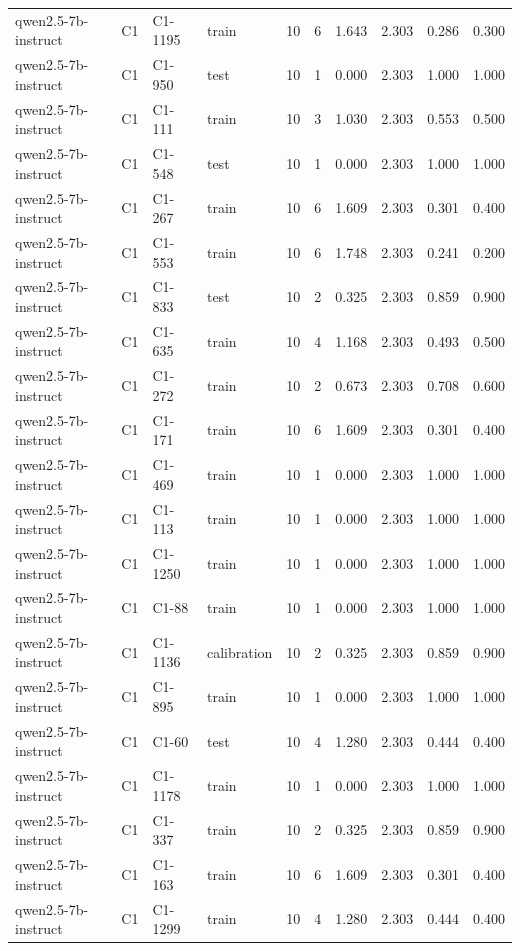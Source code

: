 \begin{table}
\begin{tabular}{llllrrrrrr}
qwen2.5-7b-instruct & C1 & C1-1195 & train & 10 & 6 & 1.643 & 2.303 & 0.286 & 0.300 \\
qwen2.5-7b-instruct & C1 & C1-950 & test & 10 & 1 & 0.000 & 2.303 & 1.000 & 1.000 \\
qwen2.5-7b-instruct & C1 & C1-111 & train & 10 & 3 & 1.030 & 2.303 & 0.553 & 0.500 \\
qwen2.5-7b-instruct & C1 & C1-548 & test & 10 & 1 & 0.000 & 2.303 & 1.000 & 1.000 \\
qwen2.5-7b-instruct & C1 & C1-267 & train & 10 & 6 & 1.609 & 2.303 & 0.301 & 0.400 \\
qwen2.5-7b-instruct & C1 & C1-553 & train & 10 & 6 & 1.748 & 2.303 & 0.241 & 0.200 \\
qwen2.5-7b-instruct & C1 & C1-833 & test & 10 & 2 & 0.325 & 2.303 & 0.859 & 0.900 \\
qwen2.5-7b-instruct & C1 & C1-635 & train & 10 & 4 & 1.168 & 2.303 & 0.493 & 0.500 \\
qwen2.5-7b-instruct & C1 & C1-272 & train & 10 & 2 & 0.673 & 2.303 & 0.708 & 0.600 \\
qwen2.5-7b-instruct & C1 & C1-171 & train & 10 & 6 & 1.609 & 2.303 & 0.301 & 0.400 \\
qwen2.5-7b-instruct & C1 & C1-469 & train & 10 & 1 & 0.000 & 2.303 & 1.000 & 1.000 \\
qwen2.5-7b-instruct & C1 & C1-113 & train & 10 & 1 & 0.000 & 2.303 & 1.000 & 1.000 \\
qwen2.5-7b-instruct & C1 & C1-1250 & train & 10 & 1 & 0.000 & 2.303 & 1.000 & 1.000 \\
qwen2.5-7b-instruct & C1 & C1-88 & train & 10 & 1 & 0.000 & 2.303 & 1.000 & 1.000 \\
qwen2.5-7b-instruct & C1 & C1-1136 & calibration & 10 & 2 & 0.325 & 2.303 & 0.859 & 0.900 \\
qwen2.5-7b-instruct & C1 & C1-895 & train & 10 & 1 & 0.000 & 2.303 & 1.000 & 1.000 \\
qwen2.5-7b-instruct & C1 & C1-60 & test & 10 & 4 & 1.280 & 2.303 & 0.444 & 0.400 \\
qwen2.5-7b-instruct & C1 & C1-1178 & train & 10 & 1 & 0.000 & 2.303 & 1.000 & 1.000 \\
qwen2.5-7b-instruct & C1 & C1-337 & train & 10 & 2 & 0.325 & 2.303 & 0.859 & 0.900 \\
qwen2.5-7b-instruct & C1 & C1-163 & train & 10 & 6 & 1.609 & 2.303 & 0.301 & 0.400 \\
qwen2.5-7b-instruct & C1 & C1-1299 & train & 10 & 4 & 1.280 & 2.303 & 0.444 & 0.400 \\

\end{tabular}
\end{table}
